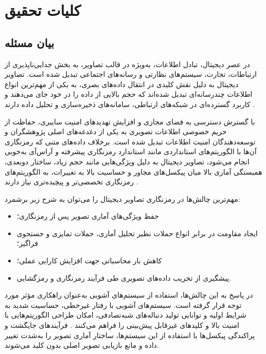 
\chapter{کلیات تحقیق}

\section{بیان مسئله}
در عصر دیجیتال، تبادل اطلاعات، به‌ویژه در قالب تصاویر، به بخش جدایی‌ناپذیری از ارتباطات، تجارت، سیستم‌های نظارتی و رسانه‌های اجتماعی تبدیل شده است. تصاویر دیجیتال به دلیل نقش کلیدی در انتقال داده‌های بصری، به یکی از مهم‌ترین انواع اطلاعات چندرسانه‌ای تبدیل شده‌اند که حجم بالایی از داده را در خود جای می‌دهند و کاربرد گسترده‌ای در شبکه‌های ارتباطی، سامانه‌های ذخیره‌سازی و تحلیل داده دارند \cite{ref1}.

با گسترش دسترسی به فضای مجازی و افزایش تهدیدهای امنیت سایبری، حفاظت از حریم خصوصی اطلاعات تصویری به یکی از دغدغه‌های اصلی پژوهشگران و توسعه‌دهندگان امنیت اطلاعات تبدیل شده است. برخلاف داده‌های متنی که رمزنگاری آن‌ها با الگوریتم‌های استانداردی مانند استاندارد رمزنگاری پیشرفته\protect{} و آراس‌آی\protect{} به‌خوبی انجام می‌شود، تصاویر دیجیتال به دلیل ویژگی‌هایی مانند حجم زیاد، ساختار دوبعدی، همبستگی آماری بالا میان پیکسل‌های مجاور و حساسیت بالا به تغییرات، به الگوریتم‌های رمزنگاری تخصصی‌تر و پیچیده‌تری نیاز دارند \cite{ref2, ref3}.

مهم‌ترین چالش‌ها در رمزنگاری تصاویر دیجیتال را می‌توان به شرح زیر برشمرد:
\begin{itemize}
    \item حفظ ویژگی‌های آماری تصویر پس از رمزنگاری؛
    \item ایجاد مقاومت در برابر انواع حملات نظیر تحلیل آماری، حملات تمایزی و جستجوی فراگیر\protect{}؛
    \item کاهش بار محاسباتی جهت افزایش کارایی عملی؛
    \item پیشگیری از تخریب داده‌های تصویری طی فرآیند رمزنگاری و رمزگشایی.
\end{itemize}

در پاسخ به این چالش‌ها، استفاده از سیستم‌های آشوبی به‌عنوان راهکاری مؤثر مورد توجه قرار گرفته است. سیستم‌های آشوبی با رفتار غیرخطی، حساسیت شدید به شرایط اولیه و توانایی تولید دنباله‌های شبه‌تصادفی، امکان طراحی الگوریتم‌هایی با امنیت بالا و کلیدهای غیرقابل پیش‌بینی را فراهم می‌کنند \cite{ref4}. فرآیندهای جایگشت و پراکندگی پیکسل‌ها با استفاده از این سیستم‌ها، ساختار آماری تصویر را به‌شدت تغییر داده و مانع بازیابی تصویر اصلی بدون کلید می‌شوند.

